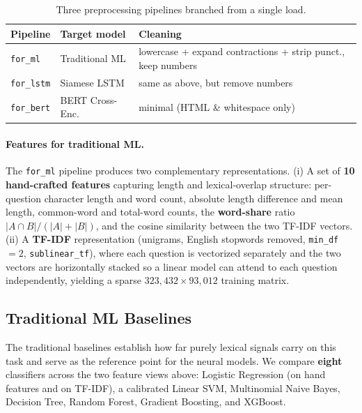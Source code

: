 \begin{table}[h]
    \centering
    \caption{Three preprocessing pipelines branched from a single load.}
    \label{tab:pipelines}
    \begin{tabular}{lll}
        \toprule
        \textbf{Pipeline} & \textbf{Target model} & \textbf{Cleaning} \\
        \midrule
        \texttt{for\_ml}   & Traditional ML  & lowercase + expand contractions + strip punct., keep numbers \\
        \texttt{for\_lstm} & Siamese LSTM    & same as above, but remove numbers \\
        \texttt{for\_bert} & BERT Cross-Enc. & minimal (HTML \& whitespace only) \\
        \bottomrule
    \end{tabular}
\end{table}

\paragraph{Features for traditional ML.}
The \texttt{for\_ml} pipeline produces two complementary representations. (i) A
set of \textbf{10 hand-crafted features} capturing length and lexical-overlap
structure: per-question character length and word count, absolute length
difference and mean length, common-word and total-word counts, the
\textbf{word-share} ratio $|A\cap B|/(|A|+|B|)$, and the cosine similarity
between the two TF-IDF vectors. (ii) A \textbf{TF-IDF} representation
(unigrams, English stopwords removed, \texttt{min\_df}\,$=2$,
\texttt{sublinear\_tf}), where each question is vectorized separately and the two
vectors are horizontally stacked so a linear model can attend to each question
independently, yielding a sparse $323{,}432 \times 93{,}012$ training matrix.

\subsection{Traditional ML Baselines}

The traditional baselines establish how far purely lexical signals carry on this
task and serve as the reference point for the neural models. We compare
\textbf{eight} classifiers across the two feature views above: Logistic
Regression (on hand features and on TF-IDF), a calibrated Linear SVM, Multinomial
Naive Bayes, Decision Tree, Random Forest, Gradient Boosting, and XGBoost.

